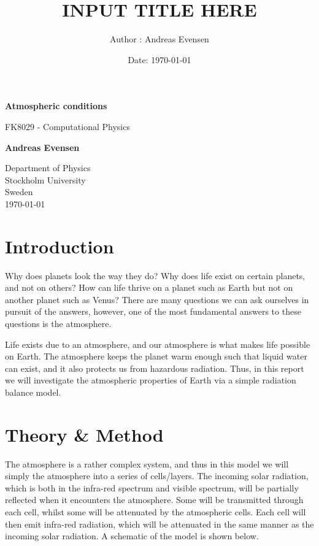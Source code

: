 \documentclass[a4paper]{article}
\title{INPUT TITLE HERE}
\author{Author : Andreas Evensen}
\date{Date: \today}
\newcommand{\newparagraph}{\vspace{.5cm}\noindent}
\begin{document}

\begin{titlepage}
    \begin{center}
        \vspace*{1cm}
        
        \Huge
        \textbf{Atmospheric conditions}
        
        \vspace{0.5cm}
        \LARGE
        FK8029 - Computational Physics
        
        \vspace{1.5cm}
        
        \textbf{Andreas Evensen}
        
        \vfill
        
        
        \Large
        Department of Physics\\
        Stockholm University\\
        Sweden\\
        \today
    \end{center}
\end{titlepage}
\tableofcontents
\newpage
\section{Introduction}
Why does planets look the way they do? Why does life exist on certain planets, and not on others? How can life thrive on a planet such as Earth but not on another planet such as Venus?
There are many questions we can ask ourselves in pursuit of the answers, however, one of the most fundamental answers to these questions is the atmosphere.

\newparagraph
Life exists due to an atmosphere, and our atmosphere is what makes life possible on Earth.
The atmosphere keeps the planet warm enough such that liquid water can exist, and it also protects us from hazardous radiation.
Thus, in this report we will investigate the atmospheric properties of Earth via a simple radiation balance model.

\section{Theory \& Method}
The atmosphere is a rather complex system, and thus in this model we will simply the atmosphere into a series of cells/layers.
The incoming solar radiation, which is both in the infra-red spectrum and visible spectrum, will be partially reflected when it encounters the atmosphere.
Some will be transmitted through each cell, whilst some will be attenuated by the atmospheric cells.
Each cell will then emit infra-red radiation, which will be attenuated in the same manner as the incoming solar radiation.
A schematic of the model is shown below\cite{Pierrehumbert2011}.
\end{document}
